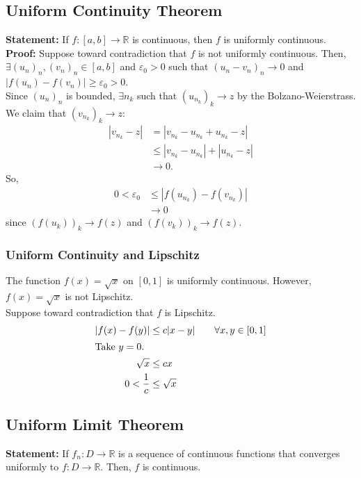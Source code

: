 \documentclass[10pt]{extarticle}
\newcommand{\R}{\mathbb{R}}
\begin{document}
  \subsection{Uniform Continuity Theorem}%
    \textbf{Statement:} If $f: [a,b] \rightarrow \R$ is continuous, then $f$ is uniformly continuous.\\

    \textbf{Proof:} Suppose toward contradiction that $f$ is not uniformly continuous. Then, $\exists (u_n)_n,(v_n)_n\in [a,b]$ and $\varepsilon_0 > 0$ such that $(u_n - v_n)_n \rightarrow 0$ and $|f(u_n)-f(v_n)| \geq \varepsilon_{0}>0$.\\

    Since $(u_n)_n$ is bounded, $\exists n_k$ such that $(u_{n_k})_k \rightarrow z$ by the Bolzano-Weierstrass. We claim that $(v_{n_k})_k \rightarrow z$:
    \begin{align*}
      \left|v_{n_k} - z\right| &= \left|v_{n_k} - u_{n_k} + u_{n_k} - z\right|\\
                               &\leq \left|v_{n_k} - u_{n_k}\right| + \left|u_{n_k} - z\right|\\
                               &\rightarrow 0.
    \end{align*}
    So,
    \begin{align*}
      0 < \varepsilon_0 &\leq |f(u_{n_k}) - f(v_{n_k})|\\
                    &\rightarrow 0
    \end{align*}
    since $(f(u_k))_k \rightarrow f(z)$ and $\left(f(v_k)\right)_k \rightarrow f(z)$.
  \subsubsection{Uniform Continuity and Lipschitz}%
    The function $f(x) = \sqrt{x}$ on $[0,1]$ is uniformly continuous. However, $f(x) = \sqrt{x}$ is not Lipschitz.\\

    Suppose toward contradiction that $f$ is Lipschitz.
    \begin{align*}
      |f(x) - f(y)| &\leq c|x-y| \tag*{$\forall x,y\in [0,1]$}\\
      \shortintertext{Take $y = 0$.}
      \sqrt{x} &\leq cx\\
      0 < \frac{1}{c} &\leq \sqrt{x}
    \end{align*}
  \subsection{Uniform Limit Theorem}%
  \textbf{Statement:} If $f_n: D\rightarrow\R$ is a sequence of continuous functions that converges uniformly to $f:D\rightarrow\R$. Then, $f$ is continuous.\\
\end{document}
